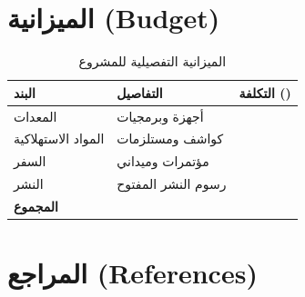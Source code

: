 \documentclass[11pt,a4paper]{article}
\begin{document}
\section{الميزانية (Budget)}
\label{sec:budget}


\begin{table}[H]
\centering
\caption{الميزانية التفصيلية للمشروع}
\begin{tabularx}{\textwidth}{L{5cm} X R{3cm}}
\toprule
\textbf{البند} & \textbf{التفاصيل} & \textbf{التكلفة ()} \\
\midrule
المعدات & أجهزة وبرمجيات &  \\
المواد الاستهلاكية & كواشف ومستلزمات &  \\
السفر & مؤتمرات وميداني &  \\
النشر & رسوم النشر المفتوح &  \\
\midrule
\textbf{المجموع} & & \textbf{} \\
\bottomrule
\end{tabularx}
\end{table}

\section{المراجع (References)}
\label{sec:references}



\end{document}
